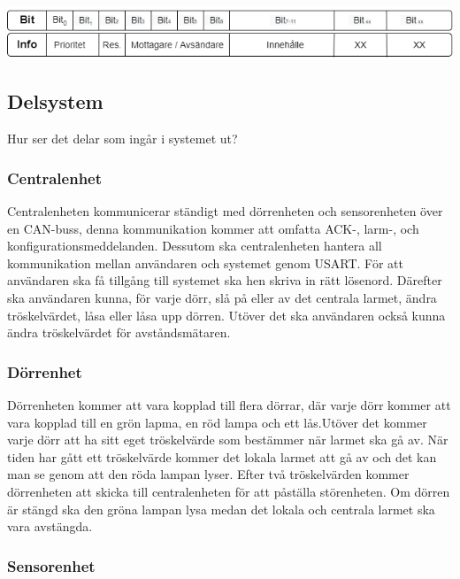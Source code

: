 \documentclass{article}
\begin{document}
\includegraphics[scale=0.5]{Projektrapport/protokoll.png}

\subsection{Delsystem}
Hur ser det delar som ingår i systemet ut?
\subsubsection{Centralenhet}
Centralenheten kommunicerar ständigt med dörrenheten och sensorenheten över en CAN-buss, denna kommunikation kommer att omfatta ACK-, larm-, och konfigurationsmeddelanden. 
Dessutom ska centralenheten hantera all kommunikation mellan användaren och systemet genom USART. För att användaren ska få tillgång till systemet ska hen skriva in rätt lösenord. 
Därefter ska användaren kunna, för varje dörr, slå på eller av det centrala larmet, ändra tröskelvärdet, låsa eller låsa upp dörren. 
Utöver det ska användaren också kunna ändra tröskelvärdet för avståndsmätaren.



\subsubsection{Dörrenhet}

Dörrenheten kommer att vara kopplad till flera dörrar, där varje dörr kommer att vara kopplad till en grön lapma, en röd lampa och ett lås.Utöver det kommer varje dörr att ha sitt eget tröskelvärde som bestämmer när larmet ska gå av. 
När tiden har gått ett tröskelvärde kommer det lokala larmet att gå av och det kan man se genom att den röda lampan lyser. 
Efter två tröskelvärden kommer dörrenheten att skicka till centralenheten för att påställa störenheten. 
Om dörren är stängd ska den gröna lampan lysa medan det lokala och centrala larmet ska vara avstängda. 

\subsubsection{Sensorenhet}
\end{document}

